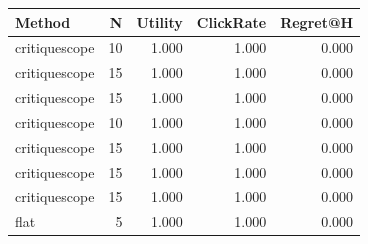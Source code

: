 \begin{tabular}{lrrrr}
\toprule
Method & N & Utility & ClickRate & Regret@H \\
\midrule
critiquescope & 10 & 1.000 & 1.000 & 0.000 \\
critiquescope & 15 & 1.000 & 1.000 & 0.000 \\
critiquescope & 15 & 1.000 & 1.000 & 0.000 \\
critiquescope & 10 & 1.000 & 1.000 & 0.000 \\
critiquescope & 15 & 1.000 & 1.000 & 0.000 \\
critiquescope & 15 & 1.000 & 1.000 & 0.000 \\
critiquescope & 15 & 1.000 & 1.000 & 0.000 \\
flat & 5 & 1.000 & 1.000 & 0.000 \\
\bottomrule
\end{tabular}
